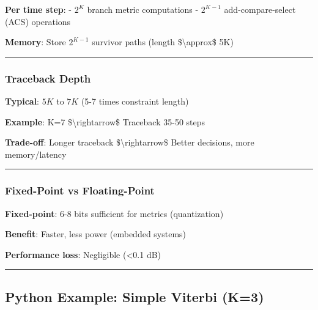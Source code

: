\textbf{Per time step}: - \(2^K\) branch metric computations -
\(2^{K-1}\) add-compare-select (ACS) operations

\textbf{Memory}: Store \(2^{K-1}\) survivor paths (length
\$\textbackslash approx\$ 5K)

\begin{center}\rule{0.5\linewidth}{0.5pt}\end{center}

\subsubsection{Traceback Depth}\label{traceback-depth}

\textbf{Typical}: \(5K\) to \(7K\) (5-7 times constraint length)

\textbf{Example}: K=7 \$\textbackslash rightarrow\$ Traceback 35-50
steps

\textbf{Trade-off}: Longer traceback \$\textbackslash rightarrow\$
Better decisions, more memory/latency

\begin{center}\rule{0.5\linewidth}{0.5pt}\end{center}

\subsubsection{Fixed-Point vs
Floating-Point}\label{fixed-point-vs-floating-point}

\textbf{Fixed-point}: 6-8 bits sufficient for metrics (quantization)

\textbf{Benefit}: Faster, less power (embedded systems)

\textbf{Performance loss}: Negligible (\textless0.1 dB)

\begin{center}\rule{0.5\linewidth}{0.5pt}\end{center}

\subsection{Python Example: Simple Viterbi
(K=3)}\label{python-example-simple-viterbi-k3}

